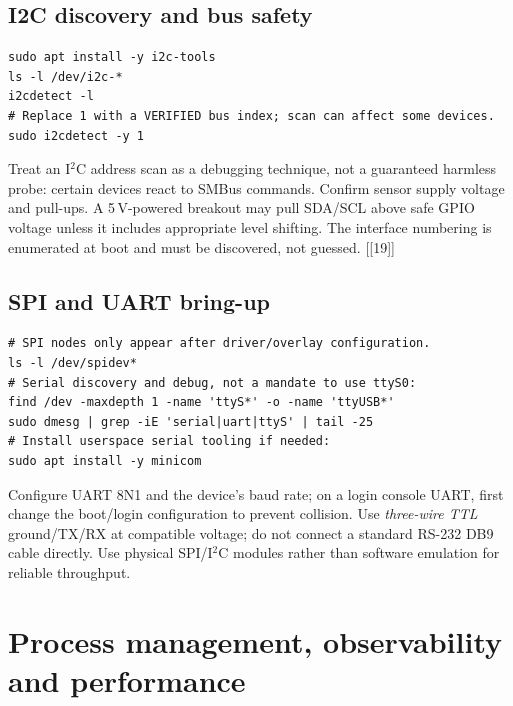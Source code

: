 \documentclass[10pt,oneside,openany]{report}
\newcommand{\smallref}[1]{{\sffamily\scriptsize\color{slate}[#1]}}
\begin{document}
\section{I2C discovery and bus safety}
\begin{lstlisting}[style=sh]
sudo apt install -y i2c-tools
ls -l /dev/i2c-*
i2cdetect -l
# Replace 1 with a VERIFIED bus index; scan can affect some devices.
sudo i2cdetect -y 1
\end{lstlisting}
Treat an I\(^{2}\)C address scan as a debugging technique, not a guaranteed harmless probe: certain devices react to SMBus commands. Confirm sensor supply voltage and pull-ups. A 5\,V-powered breakout may pull SDA/SCL above safe GPIO voltage unless it includes appropriate level shifting. The interface numbering is enumerated at boot and must be discovered, not guessed. \smallref{[19]}
\section{SPI and UART bring-up}
\begin{lstlisting}[style=sh]
# SPI nodes only appear after driver/overlay configuration.
ls -l /dev/spidev*
# Serial discovery and debug, not a mandate to use ttyS0:
find /dev -maxdepth 1 -name 'ttyS*' -o -name 'ttyUSB*'
sudo dmesg | grep -iE 'serial|uart|ttyS' | tail -25
# Install userspace serial tooling if needed:
sudo apt install -y minicom
\end{lstlisting}
Configure UART 8N1 and the device's baud rate; on a login console UART, first change the boot/login configuration to prevent collision. Use \emph{three-wire TTL} ground/TX/RX at compatible voltage; do not connect a standard RS-232 DB9 cable directly. Use physical SPI/I\(^{2}\)C modules rather than software emulation for reliable throughput.

\chapter{Process management, observability and performance}
\end{document}
